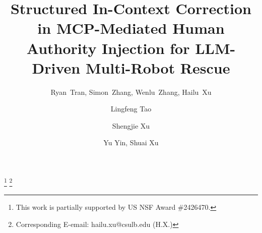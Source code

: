 \documentclass[sigconf,natbib=false]{acmart}
\begin{document}
\title{Structured In-Context Correction in MCP-Mediated Human Authority Injection for LLM-Driven Multi-Robot Rescue}

\author{Ryan~Tran, Simon~Zhang, Wenlu~Zhang, Hailu~Xu}

\author{Lingfeng Tao}

\author{Shengjie Xu}

\author{Yu Yin, Shuai Xu}

\thanks{This work is partially supported by US NSF Award \#2426470.}
\thanks{Corresponding E-email: hailu.xu@csulb.edu (H.X.)}



\renewcommand{\shortauthors}{} %
\renewcommand{\shortauthors}{Xu et al.}
\end{document}
